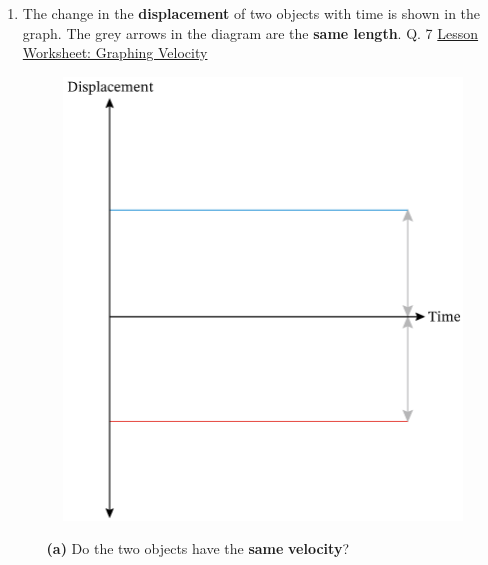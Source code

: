 \documentclass[A4,12pt]{article}
\begin{document}
\begin{enumerate}[label=\bfseries (\arabic*)]
\begin{itemize}
    
    
\end{itemize} 









\item The change in the \textbf{displacement} of two objects with time is shown in the graph. The grey arrows in the diagram are the \textbf{same length}. \cite{Nagwa} Q. 7 \href{https://www.nagwa.com/en/worksheets/715142164735/}{Lesson Worksheet: Graphing Velocity}
%
\begin{figure}[H]
    \centering
    \includegraphics[scale=0.7]{Nagwa_Q7_disp.png}
\end{figure}
%
\begin{itemize}
    \item[\bf (a)] Do the two objects have the \textbf{same} \textbf{velocity}?
    

\end{itemize}
\end{enumerate}
\end{document}
